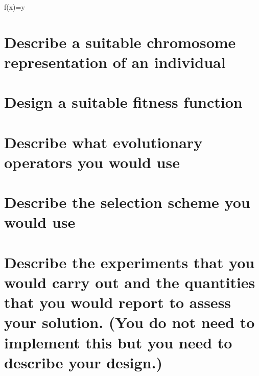 \documentclass{article}
\begin{document}
f(x)=y


\section{Describe a suitable chromosome representation of an individual}



\section{Design a suitable fitness function}

\section{Describe what evolutionary operators you would use}

\section{Describe the selection scheme you would use}

\section{Describe the experiments that you would carry out and the quantities that you would report to assess your solution. (You do not need to implement this but you need to describe your design.)}
\end{document}
